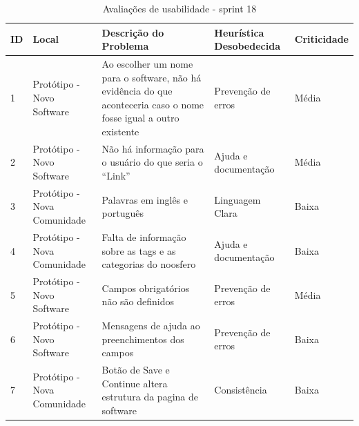 \begin{table}[h!]
\begin{tabular}{|l|p{3cm}|p{6cm}|p{3cm}|l|}
\hline
\textbf{ID} & \textbf{Local} & \textbf{Descrição do Problema}                                                                                     & \textbf{Heurística Desobedecida} & \textbf{Criticidade} \\ \hline
1           & Protótipo - Novo Software                 & Ao escolher um nome para o software, não há evidência do que aconteceria caso o nome fosse igual a outro existente & Prevenção de erros               & Média                \\ \hline
2           & Protótipo - Novo Software                 & Não há informação para o usuário do que seria o ``Link''                                                             & Ajuda e documentação             & Média                \\ \hline
3           & Protótipo - Nova Comunidade               & Palavras em inglês e português                                                                                     & Linguagem Clara                   & Baixa                \\ \hline
4           & Protótipo - Nova Comunidade               & Falta de informação sobre as tags e as categorias do noosfero                                                      & Ajuda e documentação             & Baixa                \\ \hline
5           & Protótipo - Novo Software                 & Campos obrigatórios não são definidos                                                                              & Prevenção de erros               & Média                \\ \hline
6           & Protótipo - Novo Software    & Mensagens de ajuda ao preenchimentos dos campos                                                                    & Prevenção de erros               & Baixa                \\ \hline
7           & Protótipo - Nova Comunidade               & Botão de Save e Continue altera estrutura da pagina de software                                                    & Consistência                     & Baixa                \\ \hline
\end{tabular}
\label{table_1a}
\caption{Avaliações de usabilidade - sprint 18}
\end{table}

